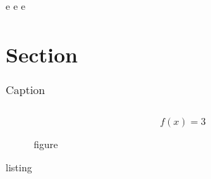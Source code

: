 \newpage e
\newpage e
\newpage e 


\section{Section}
\label{section}

\begin{table}[h]
    \centering
    \begin{tabular}{l}
          
    \end{tabular}
    \caption{Caption}
    \label{tableau}
\end{table}


\begin{equation} \label{equat}
f(x) = 3
\end{equation}

\begin{figure}
	\caption{figure}
	\label{figure}
\end{figure}


\begin{listing}
	\caption{listing}
	\label{listing}
\end{listing}
